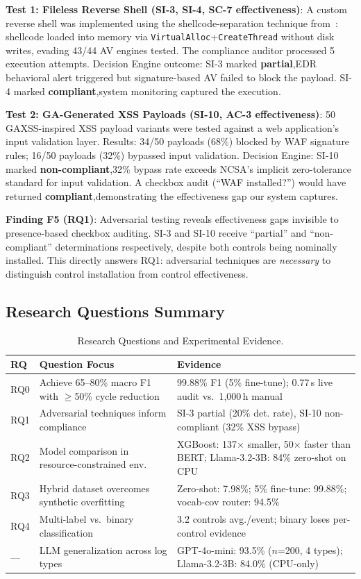 \documentclass[futureinternet,article,submit,pdftex,moreauthors]{Definitions/mdpi}
\begin{document}
\textbf{Test 1: Fileless Reverse Shell (SI-3, SI-4, SC-7 effectiveness)}: A custom reverse
shell was implemented using the shellcode-separation technique from~\cite{reverse_shell_paper}:
shellcode loaded into memory via \texttt{VirtualAlloc}+\texttt{CreateThread} without disk
writes, evading 43/44 AV engines tested. The compliance auditor processed 5 execution attempts.
Decision Engine outcome: SI-3 marked \textbf{partial},EDR behavioral alert triggered but
signature-based AV failed to block the payload. SI-4 marked \textbf{compliant},system
monitoring captured the execution.

\textbf{Test 2: GA-Generated XSS Payloads (SI-10, AC-3 effectiveness)}: 50 GAXSS-inspired
XSS payload variants were tested against a web application's input validation layer. Results:
34/50 payloads (68\%) blocked by WAF signature rules; 16/50 payloads (32\%) bypassed input
validation. Decision Engine: SI-10 marked \textbf{non-compliant},32\% bypass rate exceeds
NCSA's implicit zero-tolerance standard for input validation. A checkbox audit (``WAF
installed?'') would have returned \textbf{compliant},demonstrating the effectiveness gap
our system captures.

\textbf{Finding F5 (RQ1)}: Adversarial testing reveals effectiveness gaps invisible to
presence-based checkbox auditing. SI-3 and SI-10 receive ``partial'' and ``non-compliant''
determinations respectively, despite both controls being nominally installed. This directly
answers RQ1: adversarial techniques are \textit{necessary} to distinguish control installation
from control effectiveness.

\subsection{Research Questions Summary}

\begin{table}[H]
\caption{Research Questions and Experimental Evidence.\label{tab:rq_summary}}
\begin{tabularx}{\textwidth}{lXX}
\toprule
\textbf{RQ} & \textbf{Question Focus} & \textbf{Evidence} \\
\midrule
RQ0 & Achieve 65--80\% macro F1 with $\geq$50\% cycle reduction & 99.88\% F1 (5\% fine-tune);
0.77\,s live audit vs.\ 1{,}000\,h manual \\
RQ1 & Adversarial techniques inform compliance & SI-3 partial (20\% det. rate), SI-10
non-compliant (32\% XSS bypass) \\
RQ2 & Model comparison in resource-constrained env. & XGBoost: 137$\times$ smaller, 50$\times$
faster than BERT; Llama-3.2-3B: 84\% zero-shot on CPU \\
RQ3 & Hybrid dataset overcomes synthetic overfitting & Zero-shot: 7.98\%; 5\% fine-tune:
99.88\%; vocab-cov router: 94.5\% \\
RQ4 & Multi-label vs.\ binary classification & 3.2 controls avg./event; binary loses
per-control evidence \\
--- & LLM generalization across log types & GPT-4o-mini: 93.5\% ($n$=200, 4 types);
Llama-3.2-3B: 84.0\% (CPU-only) \\
\bottomrule
\end{tabularx}
\end{table}
\end{document}
